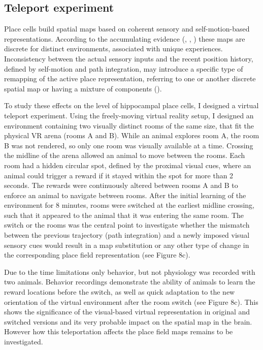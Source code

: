 \subsection{Teleport experiment}

Place cells build spatial maps based on coherent sensory and self-motion-based representations. According to the accumulating evidence (\cite{Gothard1996}, \cite{Samsonovich1997}, \cite{Derdikman2009}) these maps are discrete for distinct environments, associated with unique experiences. Inconsistency between the actual sensory inputs and the recent position history, defined by self-motion and path integration, may introduce a specific type of remapping of the active place representation, referring to one or another discrete spatial map or having a mixture of components (\cite{Jezek2011}).

To study these effects on the level of hippocampal place cells, I designed a virtual teleport experiment. Using the freely-moving virtual reality setup, I designed an environment containing two visually distinct rooms of the same size, that fit the physical VR arena (rooms A and B). While an animal explores room A, the room B was not rendered, so only one room was visually available at a time. Crossing the midline of the arena allowed an animal to move between the rooms. Each room had a hidden circular spot, defined by the proximal visual cues, where an animal could trigger a reward if it stayed within the spot for more than 2 seconds. The rewards were continuously altered between rooms A and B to enforce an animal to navigate between rooms. After the initial learning of the environment for 8 minutes, rooms were switched at the earliest midline crossing, such that it appeared to the animal that it was entering the same room. The switch or the rooms was the central point to investigate whether the mismatch between the previous trajectory (path integration) and a newly imposed visual sensory cues would result in a map substitution or any other type of change in the corresponding place field representation (see Figure 8c).

Due to the time limitations only behavior, but not physiology was recorded with two animals. Behavior recordings demonstrate the ability of animals to learn the reward locations before the switch, as well as quick adaptation to the new orientation of the virtual environment after the room switch (see Figure 8c). This shows the significance of the visual-based virtual representation in original and switched versions and its very probable impact on the spatial map in the brain. However how this teleportation affects the place field maps remains to be investigated.


